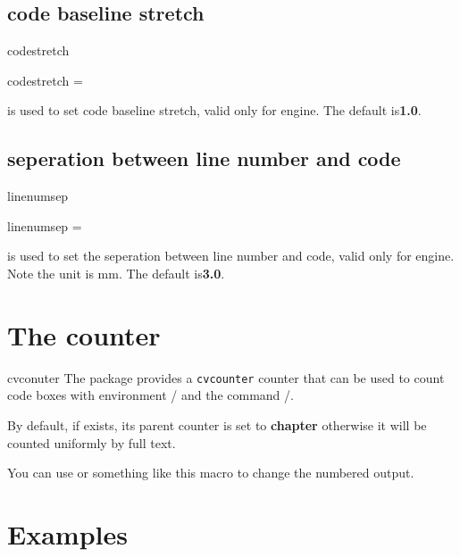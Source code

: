 \documentclass{ctxdoc-en}
\begin{document}
\subsection{code baseline stretch}

\begin{function}[added=2021-12-26,updated=2021-12-26]{codestretch}
  \begin{syntax}
    codestretch =  
  \end{syntax}
   is used to set code baseline stretch, valid only for  engine.
  The default is\textbf{1.0}.
\end{function}

\subsection{seperation between line number and code}

\begin{function}[added=2021-12-26,updated=2021-12-26]{linenumsep}
  \begin{syntax}
    linenumsep =  
  \end{syntax}
   is used to set the seperation between line number and code,
  valid only for  engine.
  Note the unit is mm.
  The default is\textbf{3.0}.
\end{function}

\section{The counter}

\begin{function}[added=2021-12-28,updated=2021-12-28]{cvconuter}
  The  package provides a \texttt{cvcounter} counter 
  that can be used to count code boxes with environment /
  and the command /. 

  By default, if  exists, its parent counter is set to \textbf{chapter}
  otherwise it will be counted uniformly by full text. 

  You can use 
  or something like this macro to change the numbered output.
\end{function}

\section{Examples}
\end{document}
